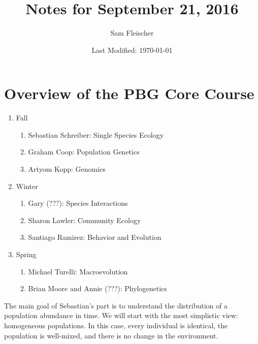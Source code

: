 \documentclass{article}
\title{Notes for September 21, 2016}
\author{Sam Fleischer}
\date{Last Modified: \today}
\begin{document}
    \maketitle

    \section{Overview of the PBG Core Course}
    \begin{enumerate}
        \item Fall
        \begin{enumerate}[$\cdot$]
            \item Sebastian Schreiber: Single Species Ecology
            \item Graham Coop: Population Genetics
            \item Artyom Kopp: Genomics
        \end{enumerate}
        \item Winter
        \begin{enumerate}[$\cdot$]
            \item Gary (???): Species Interactions
            \item Sharon Lawler: Community Ecology
            \item Santiago Ramirez: Behavior and Evolution
        \end{enumerate}
        \item Spring
        \begin{enumerate}[$\cdot$]
            \item Michael Turelli: Macroevolution
            \item Brian Moore and Annie (???): Phylogenetics
        \end{enumerate}
    \end{enumerate}

    The main goal of Sebastian's part is to understand the distribution of a population abundance in time.  We will start with the most simplistic view: homogeneous populations.  In this case, every individual is identical, the population is well-mixed, and there is no change in the environment. \\
\end{document}
